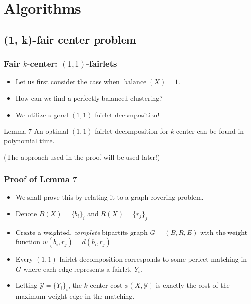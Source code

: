 \documentclass{beamer}
\DeclareMathOperator{\balance}{balance}
\begin{document}

\section{Algorithms}


\subsection{(1, k)-fair center problem}

\begin{frame}
\frametitle{Fair $k$-center: $(1, 1)$-fairlets}

\begin{itemize}
	\item Let us first consider the case when $\balance(X) = 1$. \pause
	
	\item How can we find a perfectly balanced clustering? \pause
	
	\item We utilize a good $(1, 1)$-fairlet decomposition! \pause
\end{itemize}

\begin{block}{Lemma 7}
An optimal $(1, 1)$-fairlet decomposition for $k$-center can be found in polynomial time.

\end{block}
(The approach used in the proof will be used later!)

\end{frame}



\begin{frame}
\frametitle{Proof of Lemma 7}

\begin{itemize}
	\item We shall prove this by relating it to a graph covering problem.
	
	\item Denote $B(X) = \{b_i\}_i$ and $R(X) = \{r_j\}_j$
	
	\item Create a weighted, {\it complete} bipartite graph $G = (B, R, E)$ with the weight function $w(b_i, r_j) = d(b_i, r_j)$
	
	\item Every $(1, 1)$-fairlet decomposition corresponds to some \alert{perfect matching} in $G$ where each edge represents a fairlet, $Y_i$.
	
	\item Letting $\mathcal{Y} = \{Y_i\}_i$, the $k$-center cost $\phi(X, \mathcal{Y})$ is exactly the cost of the maximum weight edge in the matching.
\end{itemize}

\end{frame}
\end{document}
